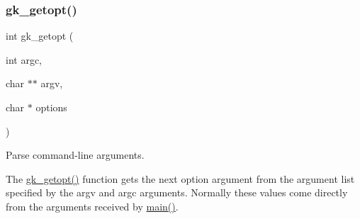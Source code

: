 \subsubsection{\texorpdfstring{gk\+\_\+getopt()}{gk\_getopt()}}
{\footnotesize\ttfamily int gk\+\_\+getopt (\begin{DoxyParamCaption}\item[{int}]{argc,  }\item[{char $\ast$$\ast$}]{argv,  }\item[{char $\ast$}]{options }\end{DoxyParamCaption})}



Parse command-\/line arguments. 

The \hyperlink{a00038_af82cf3b0fb9ec4411a987f02df3b2e47}{gk\+\_\+getopt()} function gets the next option argument from the argument list specified by the {\ttfamily argv} and {\ttfamily argc} arguments. Normally these values come directly from the arguments received by \hyperlink{a00768_a0ddf1224851353fc92bfbff6f499fa97}{main()}.


